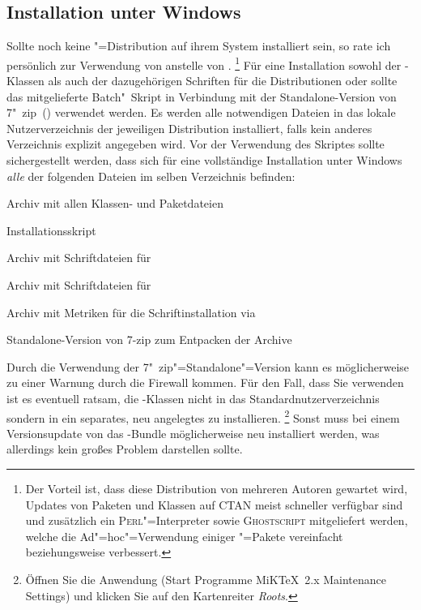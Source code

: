 \documentclass[%
  english,ngerman,%
  headings=optiontoheadandtoc,captions=tableheading,numbers=noenddot,%
  chapterpage,cdfoot,%
]{tudscrman}
\newlength{\tempdim}
\begin{document}
\subsection{Installation unter Windows}
Sollte noch keine "=Distribution auf ihrem System installiert 
sein, so rate ich persönlich zur Verwendung von  
anstelle von .%
\footnote{%
  Der Vorteil ist, dass diese Distribution von mehreren Autoren gewartet wird, 
  Updates von Paketen und Klassen auf CTAN meist schneller verfügbar sind und 
  zusätzlich ein \textsc{Perl}"=Interpreter sowie \textsc{Ghostscript} 
  mitgeliefert werden, welche die Ad"=hoc"=Verwendung einiger 
  "=Pakete vereinfacht beziehungsweise verbessert.
}
Für eine Installation sowohl der \TUDScript-Klassen als auch der dazugehörigen 
Schriften für die Distributionen  oder 
 sollte das mitgelieferte Batch"~Skript 
 in Verbindung mit der Standalone-Version 
von 7"~zip~() verwendet werden. Es werden alle notwendigen Dateien 
in das lokale Nutzerverzeichnis der jeweiligen Distribution installiert, falls 
kein anderes Verzeichnis explizit angegeben wird. Vor der Verwendung des 
Skriptes sollte sichergestellt werden, dass sich für eine vollständige 
Installation unter Windows \emph{alle} der folgenden Dateien im selben 
Verzeichnis befinden:
%
%
\begin{description}[labelwidth=\tempdim,labelsep=1em]
  \item[\File{tudscr\_\vTUDScript.zip}]Archiv mit allen Klassen- und Paketdateien
  \item[\File{tudscr\_\vTUDScript\_install.bat}]Installationsskript
  \item[\File{Univers\_PS.zip}]Archiv mit Schriftdateien für \Univers
  \item[\File{DIN\_Bd\_PS.zip}]Archiv mit Schriftdateien für \DIN
  \item[\File{tudscrfont.zip}]Archiv mit Metriken für die Schriftinstallation   
    via 
  \item[\File{7za.exe}]Standalone-Version von 7-zip zum Entpacken der Archive
\end{description}
%
Durch die Verwendung der 7"~zip"=Standalone"=Version kann es möglicherweise zu
einer Warnung durch die Firewall kommen. Für den Fall, dass Sie 
 verwenden ist es eventuell ratsam, die 
\TUDScript-Klassen nicht in das Standardnutzerverzeichnis sondern in ein 
separates, neu angelegtes zu installieren.%
\footnote{%
  Öffnen Sie die Anwendung 
  (Start \textrightarrow{} Programme \textrightarrow{} MiKTeX~2.x 
  \textrightarrow{} Maintenance \textrightarrow{} Settings)
  und klicken Sie auf den Kartenreiter \emph{Roots}.
}
Sonst muss bei einem Versionsupdate von  das 
\TUDScript-Bundle möglicherweise neu installiert werden, was allerdings kein 
großes Problem darstellen sollte.
\end{document}
